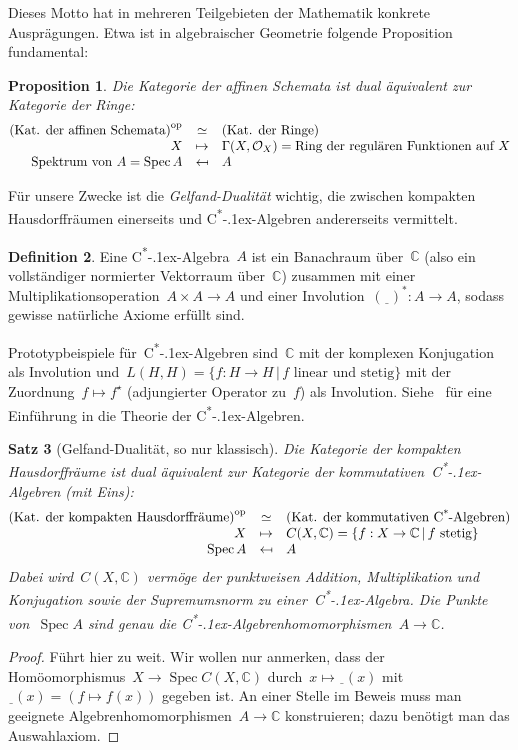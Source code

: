 \documentclass[a4paper,ngerman,12pt]{scrartcl}
\theoremstyle{definition}
\newtheorem{defn}{Definition}[section]
\theoremstyle{plain}
\newtheorem{prop}[defn]{Proposition}
\newtheorem{satz}[defn]{Satz}
\theoremstyle{remark}
\newcommand{\CC}{\mathbb{C}}
\renewcommand{\O}{\mathcal{O}}
\newcommand{\freist}{\underline{\ \ }}
\newcommand{\csalgebra}{C\textsuperscript{*}\kern-.1ex-Algebra}
\newcommand{\csalgebren}{C\textsuperscript{*}\kern-.1ex-Alge\-bren}
\DeclareMathOperator{\Spec}{Spec}
\newcommand{\op}{\mathrm{op}}
\renewcommand{\_}{\mathpunct{.}\,}
\newcommand{\?}{\,{:}\,}
\begin{document}
Dieses Motto hat in mehreren Teilgebieten der Mathematik konkrete Ausprägungen.
Etwa ist in algebraischer Geometrie folgende Proposition fundamental:
\begin{prop}Die Kategorie der affinen Schemata ist dual äquivalent zur Kategorie der
Ringe:
\[ \begin{array}{@{}rcl@{}}
  \textnormal{(Kat. der affinen Schemata)}^\op &\simeq& \textnormal{(Kat. der Ringe)} \\
  X &\mapsto& \Gamma(X, \O_X) = \textnormal{Ring der regulären Funktionen auf~$X$} \\
  \textnormal{Spektrum von~$A$} = \Spec A &\mapsfrom& A
\end{array} \]
\end{prop}

Für unsere Zwecke ist die \emph{Gelfand-Dualität} wichtig, die zwischen
kompakten Hausdorffräumen einerseits und \csalgebren{} andererseits vermittelt.
\begin{defn}Eine \csalgebra~$A$ ist ein Banachraum über~$\CC$ (also ein vollständiger
normierter Vektorraum über~$\CC$) zusammen mit einer
Multiplikationsoperation~$A \times A \to A$ und einer Involution~$(\freist)^* :
A \to A$, sodass gewisse natürliche Axiome erfüllt sind.\end{defn}
Prototypbeispiele für~\csalgebren{} sind~$\CC$ mit der komplexen Konjugation
als Involution und~$L(H,H) = \{ f : H \to H \,|\, \text{$f$ linear und stetig}
\}$ mit der Zuordnung~$f \mapsto f^\star$ (adjungierter Operator
zu~$f$) als Involution. Siehe~\cite{harpe:jones:cstar} für eine Einführung in
die Theorie der \csalgebren.
\begin{satz}[Gelfand-Dualität, so nur klassisch]
Die Kategorie der kompakten Hausdorffräume ist dual äquivalent zur Kategorie
der kommutativen~\csalgebren{} (mit Eins):
\[ \begin{array}{@{}rcl@{}}
  \textnormal{(Kat. der kompakten Hausdorffräume)}^\op &\simeq&
  \textnormal{(Kat. der kommutativen \csalgebren)} \\
  X &\mapsto& C(X, \CC) = \{ f : X \to \CC \,|\, \textnormal{$f$ stetig} \} \\
  \Spec A &\mapsfrom& A
\end{array} \]
Dabei wird~$C(X, \CC)$ vermöge der punktweisen Addition, Multiplikation und
Konjugation sowie der Supremumsnorm zu einer~\csalgebra. Die Punkte von~$\Spec
A$ sind genau die \csalgebren{}homomorphismen~$A \to \CC$.
\end{satz}
\begin{proof}
Führt hier zu weit. Wir wollen nur anmerken, dass der Homöomorphismus~$X \to
\Spec C(X,\CC)$ durch~$x \longmapsto \freist(x)$ mit~$\freist(x) = (f \mapsto
f(x))$ gegeben ist. An einer Stelle im Beweis muss man geeignete
Algebrenhomomorphismen~$A \to \CC$ konstruieren; dazu benötigt man das
Auswahlaxiom.
\end{proof}
\end{document}
